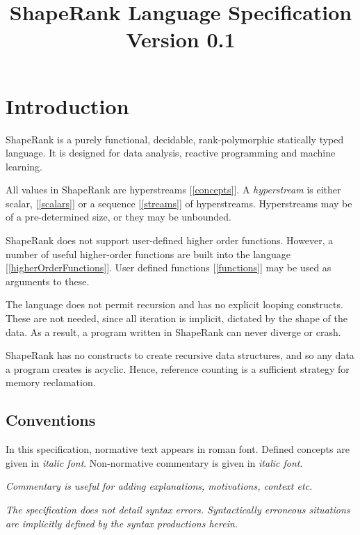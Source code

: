 \documentclass{article}
\begin{document}
\title{ShapeRank Language Specification\\
{\large Version 0.1}
}
\maketitle

\tableofcontents

\section{Introduction}

ShapeRank is a purely functional, decidable, rank-polymorphic statically typed language. It is designed for data analysis, reactive programming and machine learning. 

All values in ShapeRank are hyperstreams [\ref{concepts}]. A {\em hyperstream} is either scalar, [\ref{scalars}] or a sequence [\ref{streams}] of hyperstreams. Hyperstreams may be of a pre-determined size, or they may be unbounded. 

ShapeRank does not support user-defined higher order functions. However, a number of useful higher-order functions are built into the language [\ref{higherOrderFunctions}]. User defined functions [\ref{functions}] may be used as arguments to these.

The language does not permit recursion and has no explicit looping constructs. These are not needed, since all iteration is implicit, dictated by the shape of the data. As a result, a program written in ShapeRank can never diverge or crash. 

ShapeRank has no constructs to create recursive data structures, and so any data a program creates is acyclic. Hence, reference counting is a sufficient strategy for memory reclamation.



\subsection{Conventions}
\label{conventions}

In this specification, normative text appears in roman font. Defined concepts are given in {\em italic font}. Non-normative commentary is given in {\em italic font}.

{\em Commentary is useful for adding explanations, motivations, context etc.}

{\em 
The specification does not detail syntax errors. Syntactically erroneous situations are implicitly defined by the syntax productions herein.
}
\end{document}
